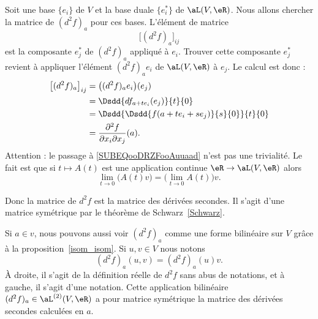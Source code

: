 Soit une base \( \{ e_i \}\) de \( V\) et la base duale \( \{ e_i^* \}\) de \( \aL(V,\eR)\). Nous allons chercher la matrice de \( (d^2f)_a\) pour ces bases. L'élément de matrice
\begin{equation}
	\big[ (d^2f)_a \big]_{ij}
\end{equation}
est la composante \( e_j^*\) de \( (d^2f)_a\) appliqué à \( e_i\). Trouver cette composante \( e_j^*\) revient à appliquer l'élément \( (d^2f)_ae_i\) de \( \aL(V,\eR)\) à \( e_j\). Le calcul est donc :
\begin{subequations}
	\begin{align}
		\big[ (d^2f)_{a} \big]_{ij} & =\big( (d^2f)_ae_i \big)(e_j)                                      \\
		                            & =\Dsdd{ df_{a+te_i}(e_j) }{t}{0}       \label{SUBEQooDRZFooAuuaad} \\
		                            & =\Dsdd{    \Dsdd{ f(a+te_i+se_j) }{s}{0}    }{t}{0}                \\
		                            & =\frac{ \partial^2f }{ \partial x_i\partial x_j }(a).
	\end{align}
\end{subequations}
Attention : le passage à \eqref{SUBEQooDRZFooAuuaad} n'est pas une trivialité. Le fait est que si \( t\mapsto A(t)\) est une application continue \( \eR\to \aL(V,\eR)\) alors
\begin{equation}
	\lim_{t\to 0} \big( A(t)v \big)=\big( \lim_{t\to 0} A(t) \big)v.
\end{equation}

Donc la matrice de \( d^2f  \) est la matrice des dérivées secondes. Il s'agit d'une matrice symétrique par le théorème de Schwarz~\ref{Schwarz}.

\begin{normaltext}      \label{NORMooZAOEooGqjpLH}
	Si \( a\in v\), nous pouvons aussi voir \( (d^2f)_a\) comme une forme bilinéaire sur \( V\) grâce à la proposition~\ref{isom_isom}. Si \( u,v\in V\) nous notons
	\begin{equation}
		(d^2f)_a(u,v)=(d^2f)_a(u)v.
	\end{equation}
	À droite, il s'agit de la définition réelle de \( d^2f\) sans abus de notations, et à gauche, il s'agit d'une notation. Cette application bilinéaire \( (d^2f)_a\in \aL^{(2)}(V,\eR)\) a pour matrice symétrique la matrice des dérivées secondes calculées en \( a\).
\end{normaltext}

